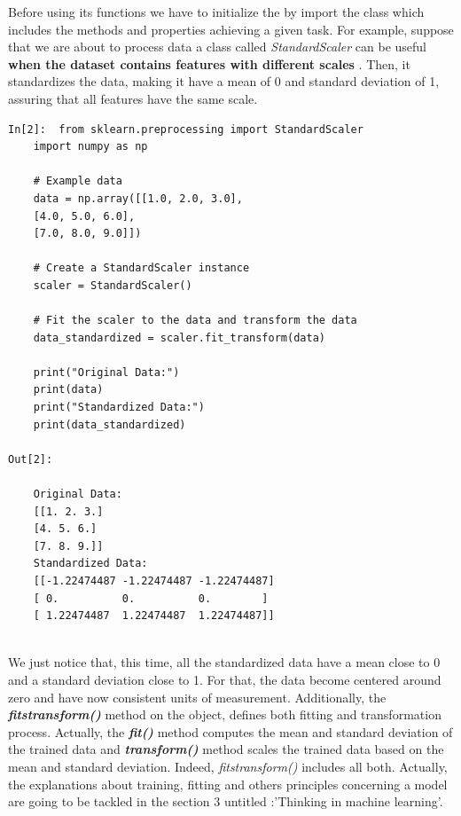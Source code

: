 \documentclass[12pt,a4paper]{report}
\begin{document}
Before using its functions we have to initialize the by import the class which includes the methods and properties achieving a given task. For example, suppose that we are about to process data a class called \textit{StandardScaler} can be useful \textbf{when the dataset contains features with different scales} . Then, it standardizes the data, making it have a mean of 0 and standard deviation of 1, assuring that all features have the same scale.
\begin{lstlisting}[style=stylepython]
In[2]:  from sklearn.preprocessing import StandardScaler
	import numpy as np
	
	# Example data
	data = np.array([[1.0, 2.0, 3.0],
	[4.0, 5.0, 6.0],
	[7.0, 8.0, 9.0]])
	
	# Create a StandardScaler instance
	scaler = StandardScaler()
	
	# Fit the scaler to the data and transform the data
	data_standardized = scaler.fit_transform(data)
	
	print("Original Data:")
	print(data)
	print("Standardized Data:")
	print(data_standardized)  
	
Out[2]:
	
	Original Data:
	[[1. 2. 3.]
	[4. 5. 6.]
	[7. 8. 9.]]
	Standardized Data:
	[[-1.22474487 -1.22474487 -1.22474487]
	[ 0.          0.          0.        ]
	[ 1.22474487  1.22474487  1.22474487]]
	
\end{lstlisting}
  We just notice that, this time, all the standardized data have a mean close to 0 and a standard deviation close to 1. For that, the data become centered around zero and have now consistent units of measurement. \newline
  Additionally, the \textit{\textbf{fitstransform()}} method on the object, defines both fitting and transformation process. Actually, the \textit{\textbf{fit()}} method computes the mean and standard deviation of the trained data and \textit{\textbf{transform()}} method scales the trained data based on the mean and standard deviation. Indeed,  \textit{fitstransform()} includes all both. \newline Actually, the explanations about training, fitting and others principles concerning a model are going to be tackled in the section 3 untitled :'Thinking in machine learning'.
  
\end{document}
